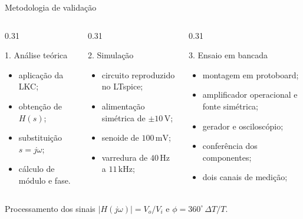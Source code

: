 \begin{frame}{Metodologia de validação}
  \small
  \begin{columns}[T,onlytextwidth]
    \begin{column}{0.31\textwidth}
      \begin{block}{1. Análise teórica}
        \begin{itemize}
          \item aplicação da LKC;
          \item obtenção de $H(s)$;
          \item substituição $s=j\omega$;
          \item cálculo de módulo e fase.
        \end{itemize}
      \end{block}
    \end{column}
    \begin{column}{0.31\textwidth}
      \begin{block}{2. Simulação}
        \begin{itemize}
          \item circuito reproduzido no LTspice;
          \item alimentação simétrica de $\pm10\,\mathrm{V}$;
          \item senoide de $100\,\mathrm{mV}$;
          \item varredura de $40\,\mathrm{Hz}$ a $11\,\mathrm{kHz}$;
        \end{itemize}
      \end{block}
    \end{column}
    \begin{column}{0.31\textwidth}
      \begin{block}{3. Ensaio em bancada}
        \begin{itemize}
          \item montagem em protoboard;
          \item amplificador operacional e fonte simétrica;
          \item gerador e osciloscópio;
          \item conferência dos componentes;
          \item dois canais de medição;
        \end{itemize}
      \end{block}
    \end{column}
  \end{columns}

  \vspace{0.08cm}
  \begin{alertblock}{Processamento dos sinais}
    \centering
    $|H(j\omega)|=V_o/V_i$
    \qquad e \qquad
    $\phi=360^{\circ}\,\Delta T/T$.
  \end{alertblock}
\end{frame}